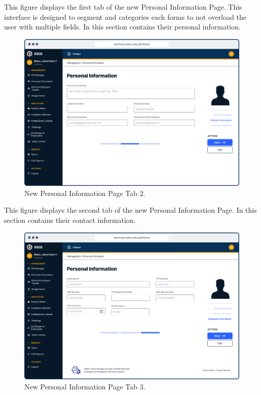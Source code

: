     This figure displays the first tab of the new Personal Information Page. This interface is designed to segment and categories each forms to not overload the user with multiple fields. In this section contains their personal information.

    \begin{figure}[H]
        \centering
        \includegraphics[width=1\linewidth]{figures/app/pi-2.png}
        \caption{New Personal Information Page Tab 2.}
        \label{fig:enter-label}
    \end{figure}

    This figure displays the second tab of the new Personal Information Page. In this section contains their contact information.

    \begin{figure}[H]
        \centering
        \includegraphics[width=1\linewidth]{figures/app/pi-3.png}
        \caption{New Personal Information Page Tab 3.}
        \label{fig:enter-label}
    \end{figure}

